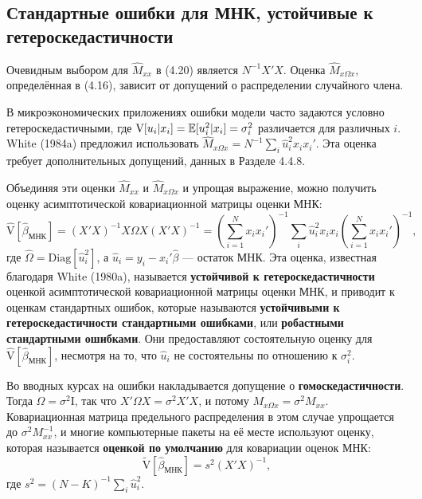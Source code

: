 \subsection{Стандартные ошибки для МНК, устойчивые к гетероскедастичности}

Очевидным выбором для $\hat{M}_{xx}$ в (4.20) является $N^{-1}X'X$. Оценка $ \hat{M}_{x \Omega x}$, определённая в (4.16), зависит от допущений о распределении случайного члена. 

В микроэкономических приложениях ошибки модели часто задаются условно гетероскедастичными, где $\mathrm{V}[u_i|x_i] = \mathbb{E}[u_i^2|x_i]= \sigma_i^2$ различается для различных $i$. White (1984a) предложил использовать  $ \hat{M}_{x \Omega x} = N^{-1}\sum_i \hat{u}_i^2 x_i x_i'$. Эта оценка требует дополнительных допущений, данных в Разделе 4.4.8.

Объединяя эти оценки $\hat{M}_{xx}$ и $\hat{M}_{x \Omega x}$ и упрощая выражение, можно получить оценку асимптотической ковариационной матрицы оценки МНК:
\begin{equation}
\mathrm{\hat{V}}[\hat{\beta}_{\text{МНК}}] = (X'X)^{-1} X\Omega X (X'X)^{-1} = (\sum_{i=1}^N x_i x_i')^{-1} \sum_i \hat{u}_i^2 x_i x_i (\sum_{i=1}^N x_i x_i')^{-1},
\end{equation}
где $\hat{\Omega} = \mathrm{Diag}[\hat{u}_i^2]$, а $\hat{u}_i = y_i - x_i'\hat{\beta}$ --- остаток МНК. Эта оценка, известная благодаря White (1980a), называется \textbf{устойчивой к гетероскедастичности} оценкой асимптотической ковариационной матрицы оценки МНК, и приводит к оценкам стандартных ошибок, которые называются \textbf{устойчивыми к гетероскедастичности стандартными ошибками}, или \textbf{робастными стандартными ошибками}. Они предоставляют состоятельную оценку для $\mathrm{\hat{V}}[\hat{\beta}_{\text{МНК}}]$, несмотря на то, что $\hat{u}_i$ не состоятельны по отношению к $\sigma_i^2$.

Во вводных курсах на ошибки накладывается допущение о \textbf{гомоскедастичности}. Тогда $\Omega = \sigma^2 \mathrm{I}$, так что $X'\Omega X = \sigma^2 X'X$, и потому $M_{x \Omega x} = \sigma^2 M_{xx}$. Ковариационная матрица предельного распределения в этом случае упрощается до $\sigma^2 M_{xx}^{-1}$, и многие компьютерные пакеты на её месте используют оценку, которая называется \textbf{оценкой по умолчанию} для ковариации оценок МНК:
\begin{equation}
 \mathrm{\tilde{V}}[\hat{\beta}_{\text{МНК}}] = s^2 (X'X)^{-1},
 \end{equation} 
где $s^2 = (N-K)^{-1} \sum_i \hat{u}_i^2$.

